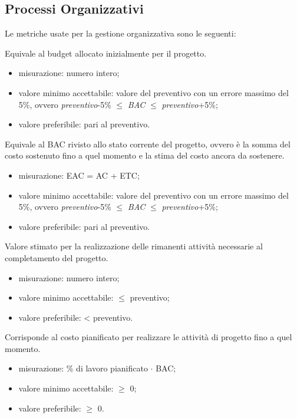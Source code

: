 \subsection{Processi Organizzativi}

	Le metriche usate per la gestione organizzativa sono le seguenti:
	
		Equivale al budget allocato inizialmente per il progetto.
		\begin{itemize}
			\item{misurazione: numero intero;}
			\item{valore minimo accettabile: valore del preventivo con un errore massimo del 5\%, ovvero \textit{preventivo}-5\% $\leq$ \textit{BAC} $\leq$ \textit{preventivo}+5\%;}
			\item{valore preferibile: pari al preventivo.}
		\end{itemize}
		
		Equivale al BAC rivisto allo stato corrente del progetto, ovvero è la somma del costo sostenuto fino a quel momento e la stima del costo ancora da sostenere.
		\begin{itemize}
			\item{misurazione: EAC = AC + ETC;}
			\item{valore minimo accettabile: valore del preventivo con un errore massimo del 5\%, ovvero \textit{preventivo}-5\% $\leq$ \textit{BAC} $\leq$ \textit{preventivo}+5\%;}
			\item{valore preferibile: pari al preventivo.}
		\end{itemize}
		
		Valore stimato per la realizzazione delle rimanenti attività necessarie al completamento del progetto.
		\begin{itemize}
			\item{misurazione: numero intero;}
			\item{valore minimo accettabile: $\leq$ preventivo;}
			\item{valore preferibile: < preventivo.}
		\end{itemize}
		
		Corrisponde al costo pianificato per realizzare le attività di progetto fino a quel momento.
		\begin{itemize}
			\item{misurazione: \% di lavoro pianificato $\cdot$ BAC;}
			\item{valore minimo accettabile: $\geq$ 0;}
			\item{valore preferibile: $\geq$ 0.}
		\end{itemize}
		
